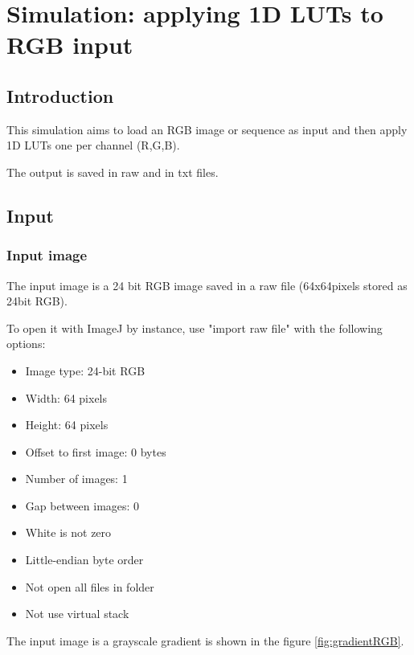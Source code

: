 \chapter{Simulation: applying 1D LUTs to RGB input}
\minitoc{}

\section{Introduction}

This simulation aims to load an RGB image or sequence as input and then apply 1D LUTs one per channel (R,G,B).

The output is saved in raw and in txt files.

\section{Input}

\subsection{Input image}

The input image is a 24 bit RGB image saved in a raw file (64x64pixels stored as 24bit RGB).

To open it with ImageJ by instance, use "import raw file" with the following options:
\begin{itemize}
\item Image type: 24-bit RGB
\item Width: 64 pixels
\item Height: 64 pixels
\item Offset to first image: 0 bytes
\item Number of images: 1
\item Gap between images: 0
\item White is not zero
\item Little-endian byte order
\item Not open all files in folder
\item Not use virtual stack
\end{itemize}

The input image is a grayscale gradient is shown in the figure \ref{fig:gradientRGB}.

